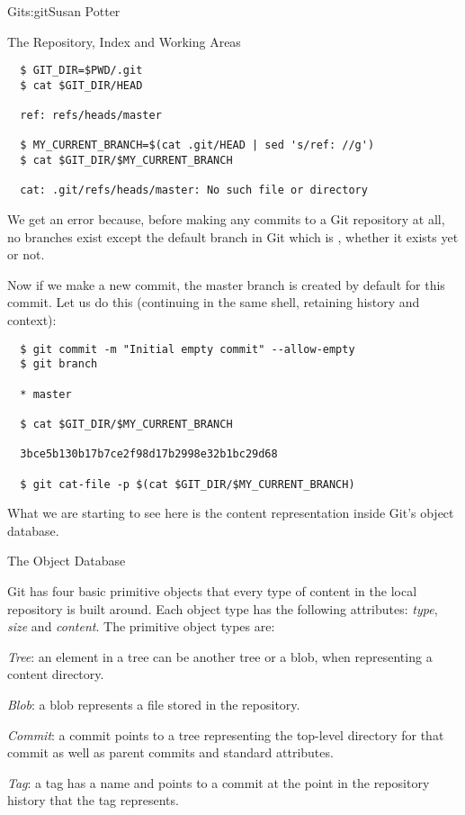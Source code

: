 \begin{aosachapter}{Git}{s:git}{Susan Potter}
\begin{aosasect1}{The Repository, Index and Working Areas}
\begin{verbatim}
  $ GIT_DIR=$PWD/.git
  $ cat $GIT_DIR/HEAD

  ref: refs/heads/master

  $ MY_CURRENT_BRANCH=$(cat .git/HEAD | sed 's/ref: //g')
  $ cat $GIT_DIR/$MY_CURRENT_BRANCH

  cat: .git/refs/heads/master: No such file or directory
\end{verbatim}

\noindent We get an error because, before making any commits to a Git repository at
all, no branches exist except the default branch in Git which is ,
whether it exists yet or not.

Now if we make a new commit, the master branch is created by default for
this commit. Let us do this (continuing in the same shell, retaining
history and context):

\begin{verbatim}
  $ git commit -m "Initial empty commit" --allow-empty
  $ git branch

  * master

  $ cat $GIT_DIR/$MY_CURRENT_BRANCH

  3bce5b130b17b7ce2f98d17b2998e32b1bc29d68

  $ git cat-file -p $(cat $GIT_DIR/$MY_CURRENT_BRANCH)
\end{verbatim}

\noindent What we are starting to see here is the content representation inside Git's
object database.

\end{aosasect1}

\begin{aosasect1}{The Object Database}


Git has four basic primitive objects that every type of content in the
local repository is built around. Each object type has the following
attributes: \emph{type}, \emph{size} and \emph{content}. The primitive object
types are:
\begin{aosaitemize}
  \item \emph{Tree}: an element in a tree can be another tree or a blob, when
  representing a content directory.
  \item \emph{Blob}: a blob represents a file stored in the repository.
  \item \emph{Commit}: a commit points to a tree representing the top-level
  directory for that commit as well as parent commits and standard
  attributes.
  \item \emph{Tag}: a tag has a name and points to a commit at the point in
  the repository history that the tag represents.
\end{aosaitemize}


\end{aosasect1}
\end{aosachapter}
